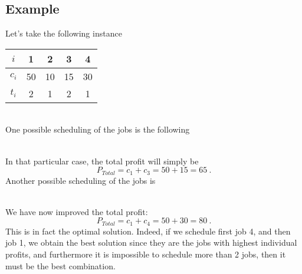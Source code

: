 \subsection{Example}
Let's take the following instance
\begin{table}[h!]
\centering
\begin{tabular}{c|cccc}
$i$ & 1 & 2 & 3 & 4 \\
\hline $c_i$ & 50 & 10 & 15 & 30 \\
$t_i$ & 2 & 1 & 2 & 1
\end{tabular}
\end{table} ~\\
One possible scheduling of the jobs is the following
\begin{figure}[h!]
\centering


\end{figure} ~\\
In that particular case, the total profit will simply be
\begin{equation*}
P_{Total} = c_1 + c_3 = 50 +15 = 65 \: .
\end{equation*}
Another possible scheduling of the jobs is
\begin{figure}[h!]
\centering


\end{figure} ~\\
We have now improved the total profit:
\begin{equation*}
P_{Total} = c_1 + c_4 = 50 + 30 = 80 \: .
\end{equation*}
This is in fact the optimal solution. Indeed, if we schedule first job 4, and then job 1, we obtain the best solution since they are the jobs with highest individual profits, and furthermore it is impossible to schedule more than 2 jobs, then it must be the best combination.


